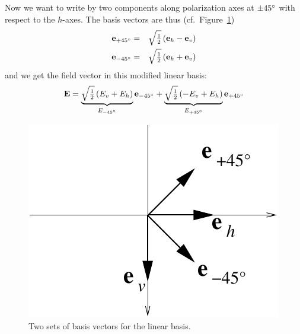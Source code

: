 Now we want to write  by two components along polarization axes at
$\pm 45^\circ$ with respect to the $h$-axes. The basis vectors are
thus (cf.\ Figure~\ref{fig:polarization:e45})
\begin{eqnarray}
  \label{eq:polarization:e_p45}
  \mathbf{e}_{+45^\circ} &=& \sqrt{\textstyle\frac{1}{2}} \left( \mathbf{e}_h - \mathbf{e}_v \right) \\
  \label{eq:polarization:e_m45}
  \mathbf{e}_{-45^\circ} &=& \sqrt{\textstyle\frac{1}{2}} \left( \mathbf{e}_h + \mathbf{e}_v \right) 
\end{eqnarray}
and we get the field vector in this modified linear basis:
\begin{equation}
  \label{eq:polarization:E_lin45base}
  \mathbf{E} = \underbrace{
               \sqrt{\textstyle\frac{1}{2}}\left(E_v +  E_h \right)}_{E_{-45^\circ}} 
               \mathbf{e}_{-45^\circ} 
              + \underbrace{
               \sqrt{\textstyle\frac{1}{2}}\left( -E_v +  E_h \right)}_{E_{+45^\circ}} 
               \mathbf{e}_{+45^\circ} 
\end{equation}
%
\begin{figure}[!h]
 \begin{center}
  \begin{minipage}[c]{0.9\textwidth}
   \begin{center}
    \includegraphics*[width=0.4\hsize]{Figs/pol_e45}
   \end{center}
  \end{minipage}
  \begin{minipage}[c]{0.9\textwidth}
   \caption{Two sets of basis vectors for the linear basis.}
   \label{fig:polarization:e45}
  \end{minipage}
 \end{center}
\end{figure}   

